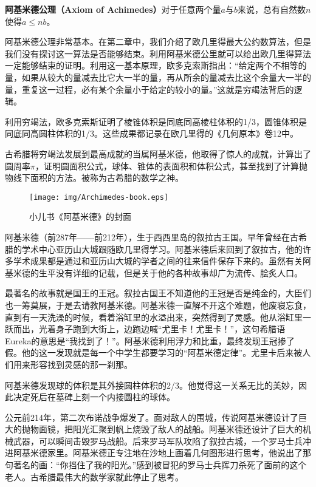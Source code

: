 \documentclass{article}
\begin{document}
\begin{axiom}
\textbf{阿基米德公理（Axiom of Achimedes）}对于任意两个量$a$与$b$来说，总有自然数$n$使得$a \leq nb$。
\end{axiom}

阿基米德公理非常基本。在第二章中，我们介绍了欧几里得最大公约数算法，但是我们没有探讨这一算法是否能够结束。利用阿基米德公里就可以给出欧几里得算法一定能够结束的证明。利用这一基本原理，欧多克索斯指出：“给定两个不相等的量，如果从较大的量减去比它大一半的量，再从所余的量减去比这个余量大一半的量，重复这一过程，必有某个余量小于给定的较小的量。”这就是穷竭法背后的逻辑。

利用穷竭法，欧多克索斯证明了棱锥体积是同底同高棱柱体积的1/3，圆锥体积是同底同高圆柱体积的1/3。这些成果都记录在欧几里得的《几何原本》卷12中\cite{HanXueTao16}。

古希腊将穷竭法发展到最高成就的当属阿基米德，他取得了惊人的成就，计算出了圆周率$\pi$，证明圆面积公式，球体、锥体的表面积和体积公式，甚至找到了计算抛物线下面积的方法。被称为古希腊的数学之神。

\begin{wrapfigure}{R}{0.4\textwidth}
 \centering
 \texttt{[image: img/Archimedes-book.eps]}
 \captionsetup{labelformat=empty}
 \caption{小儿书《阿基米德》的封面}
 \label{fig:Archimedes-book}
\end{wrapfigure}

阿基米德（前287年——前212年），生于西西里岛的叙拉古王国。早年曾经在古希腊的学术中心亚历山大城跟随欧几里得学习。阿基米德后来回到了叙拉古，他的许多学术成果都是通过和亚历山大城的学者之间的往来信件保存下来的。虽然有关阿基米德的生平没有详细的记载，但是关于他的各种故事却广为流传、脍炙人口。

最著名的故事就是国王的王冠。叙拉古国王不知道他的王冠是否是纯金的，大臣们也一筹莫展，于是去请教阿基米德。阿基米德一直解不开这个难题，他废寝忘食，直到有一天洗澡的时候，看着浴缸里的水溢出来，突然得到了灵感。他从浴缸里一跃而出，光着身子跑到大街上，边跑边喊“尤里卡！尤里卡！”，这句希腊语Eureka的意思是“我找到了！”。阿基米德利用浮力和比重，最终发现王冠掺了假。他的这一发现就是每一个中学生都要学习的“阿基米德定律”。尤里卡后来被人们用来形容找到灵感的那一刹那。

阿基米德发现球的体积是其外接圆柱体积的2/3。他觉得这一关系无比的美妙，因此决定死后在墓碑上刻一个内接圆柱的球体。

公元前214年，第二次布诺战争爆发了。面对敌人的围城，传说阿基米德设计了巨大的抛物面镜，把阳光汇聚到帆上烧毁了敌人的战船。阿基米德还设计了巨大的机械武器，可以瞬间击毁罗马战船。后来罗马军队攻陷了叙拉古城，一个罗马士兵冲进阿基米德家里。阿基米德正专注地在沙地上画着几何图形进行思考，他说出了那句著名的画：“你挡住了我的阳光。”感到被冒犯的罗马士兵挥刀杀死了面前的这个老人。古希腊最伟大的数学家就此停止了思考。
\end{document}
